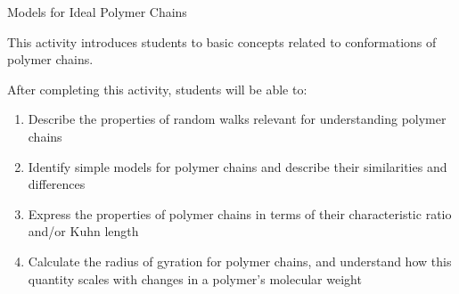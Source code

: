 %
%
%
%

\renewcommand{\figpath}{content/polymphys/chain-confs/chain-models/figs}
\renewcommand{\labelbase}{chain-models}

\begin{activity}{Models for Ideal Polymer Chains}

\begin{instructornotes}

	This activity introduces students to basic concepts related to conformations of polymer chains.
	
	After completing this activity, students will be able to:
			\begin{enumerate}
				\item Describe the properties of random walks relevant for understanding polymer chains
				\item Identify simple models for polymer chains and describe their similarities and differences
				\item Express the properties of polymer chains in terms of their characteristic ratio and/or Kuhn length
				\item Calculate the radius of gyration for polymer chains, and understand how this quantity scales with changes in a polymer's molecular weight
			\end{enumerate}
	
			

\end{instructornotes}
\end{activity}
